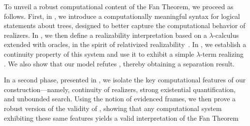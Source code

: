 To unveil a robust computational content of the Fan Theorem, we proceed as follows. First, in , we introduce a computationally meaningful syntax for logical statements about trees, designed to better capture the computational behavior of realizers. In , we then define a realizability interpretation based on a $\lambda$-calculus extended with oracles, in the spirit of relativized realizability~\cite{Goodman1978}. In , we establish a continuity property of this system and use it to exhibit a simple $\lambda$-term realizing \FT. We also show that our model refutes \WKL, thereby obtaining a separation result.

In a second phase, presented in , we isolate the key computational features of our construction—namely, continuity of realizers, strong existential quantification, and unbounded search. Using the notion of evidenced frames, we then prove a robust version of the validity of \FT, showing that any computational system exhibiting these same features yields a valid interpretation of the Fan Theorem









